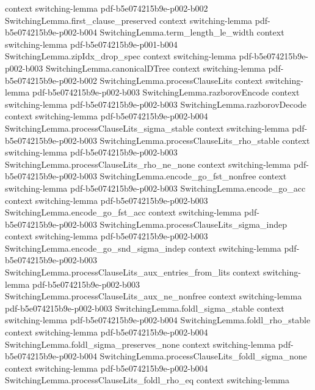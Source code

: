 \begin{lemma}
  {context}
  {switching-lemma}
  {pdf-b5e074215b9e-p002-b002}
\proofstep
  {SwitchingLemma.first_clause_preserved}
  {context}
  {switching-lemma}
  {pdf-b5e074215b9e-p002-b004}
\proofstep
  {SwitchingLemma.term_length_le_width}
  {context}
  {switching-lemma}
  {pdf-b5e074215b9e-p001-b004}
\proofstep
  {SwitchingLemma.zipIdx_drop_spec}
  {context}
  {switching-lemma}
  {pdf-b5e074215b9e-p002-b003}
\proofstep
  {SwitchingLemma.canonicalDTree}
  {context}
  {switching-lemma}
  {pdf-b5e074215b9e-p002-b002}
\proofstep
  {SwitchingLemma.processClauseLits}
  {context}
  {switching-lemma}
  {pdf-b5e074215b9e-p002-b003}
\proofstep
  {SwitchingLemma.razborovEncode}
  {context}
  {switching-lemma}
  {pdf-b5e074215b9e-p002-b003}
\proofstep
  {SwitchingLemma.razborovDecode}
  {context}
  {switching-lemma}
  {pdf-b5e074215b9e-p002-b004}
\proofstep
  {SwitchingLemma.processClauseLits_sigma_stable}
  {context}
  {switching-lemma}
  {pdf-b5e074215b9e-p002-b003}
\proofstep
  {SwitchingLemma.processClauseLits_rho_stable}
  {context}
  {switching-lemma}
  {pdf-b5e074215b9e-p002-b003}
\proofstep
  {SwitchingLemma.processClauseLits_rho_ne_none}
  {context}
  {switching-lemma}
  {pdf-b5e074215b9e-p002-b003}
\proofstep
  {SwitchingLemma.encode_go_fst_nonfree}
  {context}
  {switching-lemma}
  {pdf-b5e074215b9e-p002-b003}
\proofstep
  {SwitchingLemma.encode_go_acc}
  {context}
  {switching-lemma}
  {pdf-b5e074215b9e-p002-b003}
\proofstep
  {SwitchingLemma.encode_go_fst_acc}
  {context}
  {switching-lemma}
  {pdf-b5e074215b9e-p002-b003}
\proofstep
  {SwitchingLemma.processClauseLits_sigma_indep}
  {context}
  {switching-lemma}
  {pdf-b5e074215b9e-p002-b003}
\proofstep
  {SwitchingLemma.encode_go_snd_sigma_indep}
  {context}
  {switching-lemma}
  {pdf-b5e074215b9e-p002-b003}
\proofstep
  {SwitchingLemma.processClauseLits_aux_entries_from_lits}
  {context}
  {switching-lemma}
  {pdf-b5e074215b9e-p002-b003}
\proofstep
  {SwitchingLemma.processClauseLits_aux_ne_nonfree}
  {context}
  {switching-lemma}
  {pdf-b5e074215b9e-p002-b003}
\proofstep
  {SwitchingLemma.foldl_sigma_stable}
  {context}
  {switching-lemma}
  {pdf-b5e074215b9e-p002-b004}
\proofstep
  {SwitchingLemma.foldl_rho_stable}
  {context}
  {switching-lemma}
  {pdf-b5e074215b9e-p002-b004}
\proofstep
  {SwitchingLemma.foldl_sigma_preserves_none}
  {context}
  {switching-lemma}
  {pdf-b5e074215b9e-p002-b004}
\proofstep
  {SwitchingLemma.processClauseLits_foldl_sigma_none}
  {context}
  {switching-lemma}
  {pdf-b5e074215b9e-p002-b004}
\proofstep
  {SwitchingLemma.processClauseLits_foldl_rho_eq}
  {context}
  {switching-lemma}

\end{lemma}
